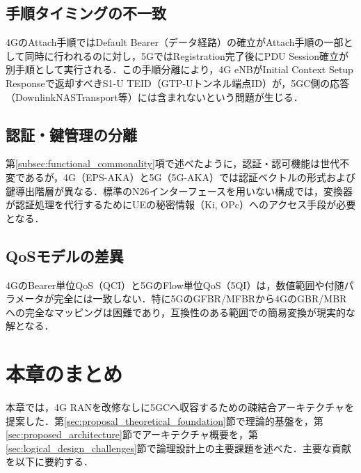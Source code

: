 \subsection{手順タイミングの不一致}
4GのAttach手順ではDefault Bearer（データ経路）の確立がAttach手順の一部として同時に行われるのに対し，5GではRegistration完了後にPDU Session確立が別手順として実行される．この手順分離により，4G eNBがInitial Context Setup Responseで返却すべきS1-U TEID（GTP-Uトンネル端点ID）が，5GC側の応答（DownlinkNASTransport等）には含まれないという問題が生じる．

\subsection{認証・鍵管理の分離}
第\ref{subsec:functional_commonality}項で述べたように，認証・認可機能は世代不変であるが，4G（EPS-AKA）と5G（5G-AKA）では認証ベクトルの形式および鍵導出階層が異なる．標準のN26インターフェースを用いない構成では，変換器が認証処理を代行するためにUEの秘密情報（Ki, OPc）へのアクセス手段が必要となる．

\subsection{QoSモデルの差異}
4GのBearer単位QoS（QCI）と5GのFlow単位QoS（5QI）は，数値範囲や付随パラメータが完全には一致しない．特に5GのGFBR/MFBRから4GのGBR/MBRへの完全なマッピングは困難であり，互換性のある範囲での簡易変換が現実的な解となる．

\section{本章のまとめ}

本章では，4G RANを改修なしに5GCへ収容するための疎結合アーキテクチャを提案した．第\ref{sec:proposal_theoretical_foundation}節で理論的基盤を，第\ref{sec:proposed_architecture}節でアーキテクチャ概要を，第\ref{sec:logical_design_challenges}節で論理設計上の主要課題を述べた．主要な貢献を以下に要約する．

